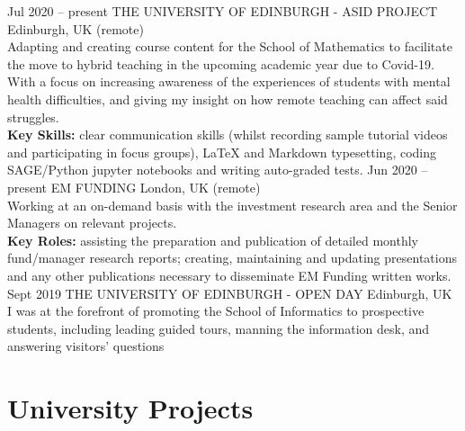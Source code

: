 \documentclass[]{cv-style}          %
\begin{document}
\begin{entrylist}
\entry
  {Jul 2020 -- present}
  {THE UNIVERSITY OF EDINBURGH - ASID PROJECT}
  {Edinburgh, UK (remote)}
  {\\
  Adapting and creating course content for the School of Mathematics to facilitate the move to hybrid teaching in the upcoming academic year due to Covid-19. With a focus on increasing awareness of the experiences of students with mental health difficulties, and giving my insight on how remote teaching can affect said struggles. \\
  \textbf{Key Skills:} clear communication skills (whilst recording sample tutorial videos and participating in focus groups), \LaTeX{} and Markdown typesetting, coding SAGE/Python jupyter notebooks and writing auto-graded tests.} 
\entry
  {Jun 2020 -- present}
  {EM FUNDING}
  {London, UK (remote)}
  { \\
  Working at an on-demand basis with the investment research area and the Senior Managers on relevant projects. \\
  \textbf{Key Roles:} assisting the preparation and publication of detailed monthly fund/manager research reports; creating, maintaining and updating presentations and any other publications necessary to disseminate EM Funding written works.} 
\entry
  {Sept 2019}
  {THE UNIVERSITY OF EDINBURGH - OPEN DAY}
  {Edinburgh, UK}
  {\\
  I was at the forefront of promoting the School of Informatics to prospective students, including leading guided tours, manning the information desk, and answering visitors' questions}
\end{entrylist}

\section{University Projects}
\end{document}
